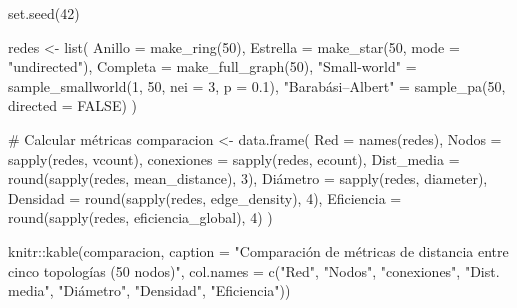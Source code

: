 \documentclass[
  letterpaper,
  DIV=11,
  numbers=noendperiod]{scrreprt}
\newenvironment{Shaded}{\begin{snugshade}}{\end{snugshade}}
\newcommand{\AttributeTok}[1]{\textcolor[rgb]{0.40,0.45,0.13}{#1}}
\newcommand{\CommentTok}[1]{\textcolor[rgb]{0.37,0.37,0.37}{#1}}
\newcommand{\ConstantTok}[1]{\textcolor[rgb]{0.56,0.35,0.01}{#1}}
\newcommand{\DecValTok}[1]{\textcolor[rgb]{0.68,0.00,0.00}{#1}}
\newcommand{\FloatTok}[1]{\textcolor[rgb]{0.68,0.00,0.00}{#1}}
\newcommand{\FunctionTok}[1]{\textcolor[rgb]{0.28,0.35,0.67}{#1}}
\newcommand{\NormalTok}[1]{\textcolor[rgb]{0.00,0.23,0.31}{#1}}
\newcommand{\OtherTok}[1]{\textcolor[rgb]{0.00,0.23,0.31}{#1}}
\newcommand{\SpecialCharTok}[1]{\textcolor[rgb]{0.37,0.37,0.37}{#1}}
\newcommand{\StringTok}[1]{\textcolor[rgb]{0.13,0.47,0.30}{#1}}
\begin{document}
\begin{Shaded}
\begin{Highlighting}[]
\FunctionTok{set.seed}\NormalTok{(}\DecValTok{42}\NormalTok{)}

\NormalTok{redes }\OtherTok{\textless{}{-}} \FunctionTok{list}\NormalTok{(}
  \AttributeTok{Anillo       =} \FunctionTok{make\_ring}\NormalTok{(}\DecValTok{50}\NormalTok{),}
  \AttributeTok{Estrella     =} \FunctionTok{make\_star}\NormalTok{(}\DecValTok{50}\NormalTok{, }\AttributeTok{mode =} \StringTok{"undirected"}\NormalTok{),}
  \AttributeTok{Completa     =} \FunctionTok{make\_full\_graph}\NormalTok{(}\DecValTok{50}\NormalTok{),}
  \StringTok{"Small{-}world"} \OtherTok{=} \FunctionTok{sample\_smallworld}\NormalTok{(}\DecValTok{1}\NormalTok{, }\DecValTok{50}\NormalTok{, }\AttributeTok{nei =} \DecValTok{3}\NormalTok{, }\AttributeTok{p =} \FloatTok{0.1}\NormalTok{),}
  \StringTok{"Barabási–Albert"} \OtherTok{=} \FunctionTok{sample\_pa}\NormalTok{(}\DecValTok{50}\NormalTok{, }\AttributeTok{directed =} \ConstantTok{FALSE}\NormalTok{)}
\NormalTok{)}

\CommentTok{\# Calcular métricas}
\NormalTok{comparacion }\OtherTok{\textless{}{-}} \FunctionTok{data.frame}\NormalTok{(}
  \AttributeTok{Red =} \FunctionTok{names}\NormalTok{(redes),}
  \AttributeTok{Nodos =} \FunctionTok{sapply}\NormalTok{(redes, vcount),}
  \AttributeTok{conexiones =} \FunctionTok{sapply}\NormalTok{(redes, ecount),}
  \AttributeTok{Dist\_media =} \FunctionTok{round}\NormalTok{(}\FunctionTok{sapply}\NormalTok{(redes, mean\_distance), }\DecValTok{3}\NormalTok{),}
\NormalTok{  Diámetro }\OtherTok{=} \FunctionTok{sapply}\NormalTok{(redes, diameter),}
  \AttributeTok{Densidad =} \FunctionTok{round}\NormalTok{(}\FunctionTok{sapply}\NormalTok{(redes, edge\_density), }\DecValTok{4}\NormalTok{),}
  \AttributeTok{Eficiencia =} \FunctionTok{round}\NormalTok{(}\FunctionTok{sapply}\NormalTok{(redes, eficiencia\_global), }\DecValTok{4}\NormalTok{)}
\NormalTok{)}

\NormalTok{knitr}\SpecialCharTok{::}\FunctionTok{kable}\NormalTok{(comparacion,}
             \AttributeTok{caption =} \StringTok{"Comparación de métricas de distancia entre cinco topologías (50 nodos)"}\NormalTok{,}
             \AttributeTok{col.names =} \FunctionTok{c}\NormalTok{(}\StringTok{"Red"}\NormalTok{, }\StringTok{"Nodos"}\NormalTok{, }\StringTok{"conexiones"}\NormalTok{, }\StringTok{"Dist. media"}\NormalTok{, }
                           \StringTok{"Diámetro"}\NormalTok{, }\StringTok{"Densidad"}\NormalTok{, }\StringTok{"Eficiencia"}\NormalTok{))}
\end{Highlighting}
\end{Shaded}
\end{document}
